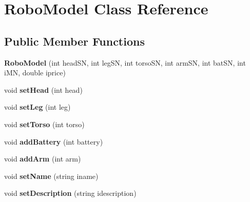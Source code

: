 \hypertarget{classRoboModel}{}\section{Robo\+Model Class Reference}
\label{classRoboModel}
\subsection*{Public Member Functions}
\begin{DoxyCompactItemize}
\item 
{\bfseries Robo\+Model} (int head\+SN, int leg\+SN, int torso\+SN, int arm\+SN, int bat\+SN, int i\+MN, double iprice)\hypertarget{classRoboModel_a9f3494fa74012dabed0655f5ef0c9d3b}{}\label{classRoboModel_a9f3494fa74012dabed0655f5ef0c9d3b}

\item 
void {\bfseries set\+Head} (int head)\hypertarget{classRoboModel_afede39ad73fb51fbfc895b7b37bf0334}{}\label{classRoboModel_afede39ad73fb51fbfc895b7b37bf0334}

\item 
void {\bfseries set\+Leg} (int leg)\hypertarget{classRoboModel_a75d9cf2b1b9315b8bdb3a694becd7e73}{}\label{classRoboModel_a75d9cf2b1b9315b8bdb3a694becd7e73}

\item 
void {\bfseries set\+Torso} (int torso)\hypertarget{classRoboModel_a7a609f8a040d298799940288530e146e}{}\label{classRoboModel_a7a609f8a040d298799940288530e146e}

\item 
void {\bfseries add\+Battery} (int battery)\hypertarget{classRoboModel_aa7a0f295cb296a6eee2a337c07076a3b}{}\label{classRoboModel_aa7a0f295cb296a6eee2a337c07076a3b}

\item 
void {\bfseries add\+Arm} (int arm)\hypertarget{classRoboModel_aab718db5d86837fc44b204ae247374d1}{}\label{classRoboModel_aab718db5d86837fc44b204ae247374d1}

\item 
void {\bfseries set\+Name} (string iname)\hypertarget{classRoboModel_aedb3ffc1c340cdc21be6c5a85ceaf3d8}{}\label{classRoboModel_aedb3ffc1c340cdc21be6c5a85ceaf3d8}

\item 
void {\bfseries set\+Description} (string idescription)\hypertarget{classRoboModel_aaf63fe8d02db31e221e0594f3eb3e2ba}{}\label{classRoboModel_aaf63fe8d02db31e221e0594f3eb3e2ba}


\end{DoxyCompactItemize}
